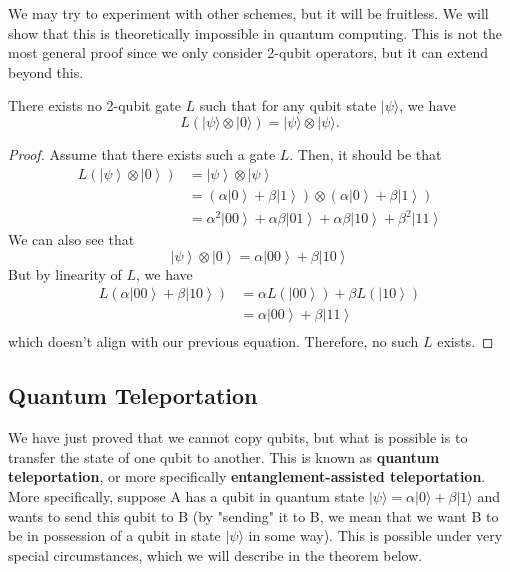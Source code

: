 \documentclass{article}
\newcommand{\ket}[1]{\ensuremath{\left|#1\right\rangle}}
\begin{document}
    We may try to experiment with other schemes, but it will be fruitless. We will show that this is theoretically impossible in quantum computing. This is not the most general proof since we only consider 2-qubit operators, but it can extend beyond this. 

    \begin{theorem}
      There exists no 2-qubit gate $L$ such that for any qubit state $|\psi \rangle$, we have 
      \begin{equation} 
        L(|\psi \rangle \otimes |0\rangle) = |\psi \rangle \otimes |\psi \rangle. 
      \end{equation}
    \end{theorem}
    \begin{proof} 
      Assume that there exists such a gate $L$. Then, it should be that 
      \begin{align} 
        L(\ket{\psi} \otimes \ket{0}) 
        & = \ket{\psi} \otimes \ket{\psi} \\
        & = (\alpha \ket{0} + \beta \ket{1}) \otimes (\alpha \ket{0} + \beta \ket{1}) \\  
        & = \alpha^2 \ket{00} + \alpha \beta \ket{01} + \alpha \beta \ket{10} + \beta^2 \ket{11}
      \end{align}
      We can also see that 
      \begin{equation} 
        \ket{\psi} \otimes \ket{0} = \alpha \ket{00} + \beta \ket{10}
      \end{equation}
      But by linearity of $L$, we have 
      \begin{align} 
        L(\alpha \ket{00} + \beta \ket{10}) & = \alpha L(\ket{00}) + \beta L(\ket{10}) \\ 
                                            & = \alpha \ket{00} + \beta \ket{11} \\
      \end{align}
      which doesn't align with our previous equation. Therefore, no such $L$ exists. 
    \end{proof}

  \subsection{Quantum Teleportation} 

    We have just proved that we cannot copy qubits, but what is possible is to transfer the state of one qubit to another. This is known as \textbf{quantum teleportation}, or more specifically \textbf{entanglement-assisted teleportation}. More specifically, suppose A has a qubit in quantum state $|\psi \rangle = \alpha |0\rangle + \beta |1 \rangle$ and wants to send this qubit to B (by "sending" it to B, we mean that we want B to be in possession of a qubit in state $|\psi \rangle$ in some way). This is possible under very special circumstances, which we will describe in the theorem below. 
\end{document}
